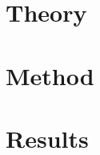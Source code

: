 \mainmatter

\chapter{Theory}
\label{cha:theory}


\chapter{Method}
\label{cha:method}


\chapter{Results}
\label{cha:results}

